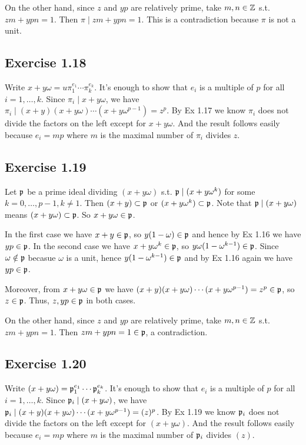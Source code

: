 \documentclass[../Marcus.tex]{subfiles}
\begin{document}
On the other hand, since $z$ and $yp$ are relatively prime, take $m,n\in\mathbb{Z}$ s.t. $zm+ypn=1$. Then $\pi\mid zm+ypn=1$. This is a contradiction because $\pi$ is not a unit.

\subsection*{Exercise 1.18}

Write $x+y\omega=u\pi_1^{e_1}\cdots\pi_k^{e_k}$. It's enough to show that $e_i$ is a multiple of $p$ for all $i=1,\ldots,k$. Since $\pi_i\mid x+y\omega$, we have $\pi_i\mid (x+y)(x+y\omega)\cdots(x+y\omega^{p-1})=z^p$. By Ex 1.17 we know $\pi_i$ does not divide the factors on the left except for $x+y\omega$. And the result follows easily because $e_i=mp$ where $m$ is the maximal number of $\pi_i$ divides $z$.

\subsection*{Exercise 1.19}

Let $\mathfrak{p}$ be a prime ideal dividing $(x+y\omega)$ s.t. $\mathfrak{p}\mid (x+y\omega^k)$ for some $k=0,\ldots,p-1,k\neq 1$. Then $(x+y)\subset\mathfrak{p}$ or $(x+y\omega^k)\subset\mathfrak{p}$. Note that $\mathfrak{p}\mid (x+y\omega)$ means $(x+y\omega)\subset \mathfrak{p}$. So $x+y\omega\in\mathfrak{p}$.

In the first case we have $x+y\in\mathfrak{p}$, so $y(1-\omega)\in\mathfrak{p}$ and hence by Ex 1.16 we have $yp\in\mathfrak{p}$. In the second case we have $x+y\omega^k\in\mathfrak{p}$, so $y\omega(1-\omega^{k-1})\in\mathfrak{p}$. Since $\omega\notin\mathfrak{p}$ becasue $\omega$ is a unit, hence $y(1-\omega^{k-1})\in\mathfrak{p}$ and by Ex 1.16 again we have $yp\in\mathfrak{p}$.

Moreover, from $x+y\omega\in\mathfrak{p}$ we have $(x+y)(x+y\omega)\cdots(x+y\omega^{p-1})=z^p\in\mathfrak{p}$, so $z\in\mathfrak{p}$. Thus, $z,yp\in\mathfrak{p}$ in both cases.

On the other hand, since $z$ and $yp$ are relatively prime, take $m,n\in\mathbb{Z}$ s.t. $zm+ypn=1$. Then $zm+ypn=1\in\mathfrak{p}$, a contradiction.

\subsection*{Exercise 1.20}

Write $(x+y\omega)=\mathfrak{p}_1^{e_1}\cdots\mathfrak{p}_k^{e_k}$. It's enough to show that $e_i$ is a multiple of $p$ for all $i=1,\ldots,k$. Since $\mathfrak{p}_i\mid(x+y\omega)$, we have $\mathfrak{p}_i\mid(x+y)(x+y\omega)\cdots(x+y\omega^{p-1})=(z)^p$. By Ex 1.19 we know $\mathfrak{p}_i$ does not divide the factors on the left except for $(x+y\omega)$. And the result follows easily because $e_i=mp$ where $m$ is the maximal number of $\mathfrak{p}_i$ divides $(z)$.
\end{document}

